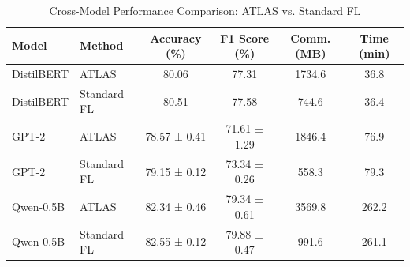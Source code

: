 \begin{table}[!t]
\renewcommand{\arraystretch}{1.2}
\caption{Cross-Model Performance Comparison: ATLAS vs. Standard FL}
\label{tab:cross_model}
\centering
\begin{tabular}{l|l|cc|cc}
\hline\hline
Model & Method & Accuracy (\%) & F1 Score (\%) & Comm. (MB) & Time (min) \\
\hline
DistilBERT & ATLAS & 80.06 & 77.31 & 1734.6 & 36.8 \\
DistilBERT & Standard FL & 80.51 & 77.58 & 744.6 & 36.4 \\
GPT-2 & ATLAS & 78.57 ± 0.41 & 71.61 ± 1.29 & 1846.4 & 76.9 \\
GPT-2 & Standard FL & 79.15 ± 0.12 & 73.34 ± 0.26 & 558.3 & 79.3 \\
Qwen-0.5B & ATLAS & 82.34 ± 0.46 & 79.34 ± 0.61 & 3569.8 & 262.2 \\
Qwen-0.5B & Standard FL & 82.55 ± 0.12 & 79.88 ± 0.47 & 991.6 & 261.1 \\
\hline\hline
\end{tabular}
\end{table}
